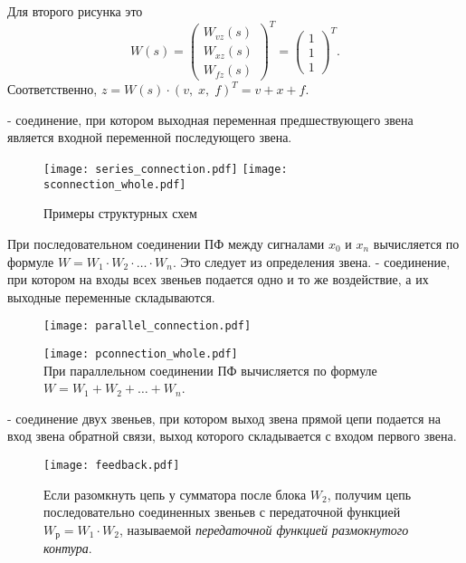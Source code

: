 \documentclass[../../TAU.tex]{subfiles}
\begin{document}
    Для второго рисунка это
    $$
        W(s) =
        \begin{pmatrix}
            W_{vz}(s)\\
            W_{xz}(s)\\
            W_{fz}(s)
        \end{pmatrix}^T =
        \begin{pmatrix}
            1\\
            1\\
            1
        \end{pmatrix}^T.
    $$
    Соответственно, 
    $z = W(s) \cdot (v,\; x,\; f)^T= v+x+f$.

     - соединение, при котором выходная переменная предшествующего звена является входной переменной последующего звена.
    \begin{figure}[h]
        \centering
        \texttt{[image: series\_connection.pdf]}
        \texttt{[image: sconnection\_whole.pdf]}
        \caption{Примеры структурных схем}
        \centering
    \end{figure}
    При последовательном соединении ПФ между сигналами $x_0$ и $x_n$ вычисляется по формуле 
    $W = W_1\cdot W_2\cdot \ldots\cdot W_n$. Это следует из определения звена.
     - соединение, при котором на входы всех звеньев подается одно и то же воздействие, а их выходные переменные складываются.
    \begin{figure}[h]
        \begin{minipage}[h]{0.39\linewidth}
            \texttt{[image: parallel\_connection.pdf]}
        \end{minipage}
        \begin{minipage}[h]{0.59\linewidth}
            \texttt{[image: pconnection\_whole.pdf]}\\
            При параллельном соединении ПФ вычисляется по формуле 
            $W = W_1+W_2+\ldots + W_n$.
        \end{minipage}
    \end{figure}
     - соединение двух звеньев, при котором выход звена прямой цепи подается на вход звена обратной связи, выход которого складывается с входом первого звена.
    \begin{figure}[h]
        \begin{minipage}[h]{0.39\linewidth}
            \texttt{[image: feedback.pdf]}
        \end{minipage}
        \begin{minipage}[h]{0.60\linewidth}
            Если разомкнуть цепь у сумматора после блока $W_2$, получим цепь последовательно соединенных звеньев с передаточной функцией 
            $W_{\text{р}} = W_1 \cdot W_2$, 
            называемой {\it передаточной функцией размокнутого контура}.
        \end{minipage}
    \end{figure}
\end{document}
